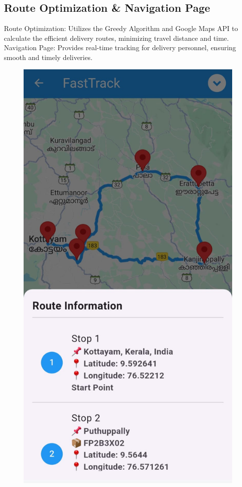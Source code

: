\subsection{Route Optimization \& Navigation Page}
Route Optimization: Utilizes the Greedy Algorithm and Google Maps API to calculate the efficient delivery routes, minimizing travel distance and time.
\\
Navigation Page: Provides real-time tracking for delivery personnel, ensuring smooth and timely deliveries.
\begin{figure}[H]
\centering
\begin{minipage}{0.24\textwidth}
    \centering
    \includegraphics[width=\linewidth]{4/Route_Optimization2.jpg}

\end{minipage}
\end{figure}

